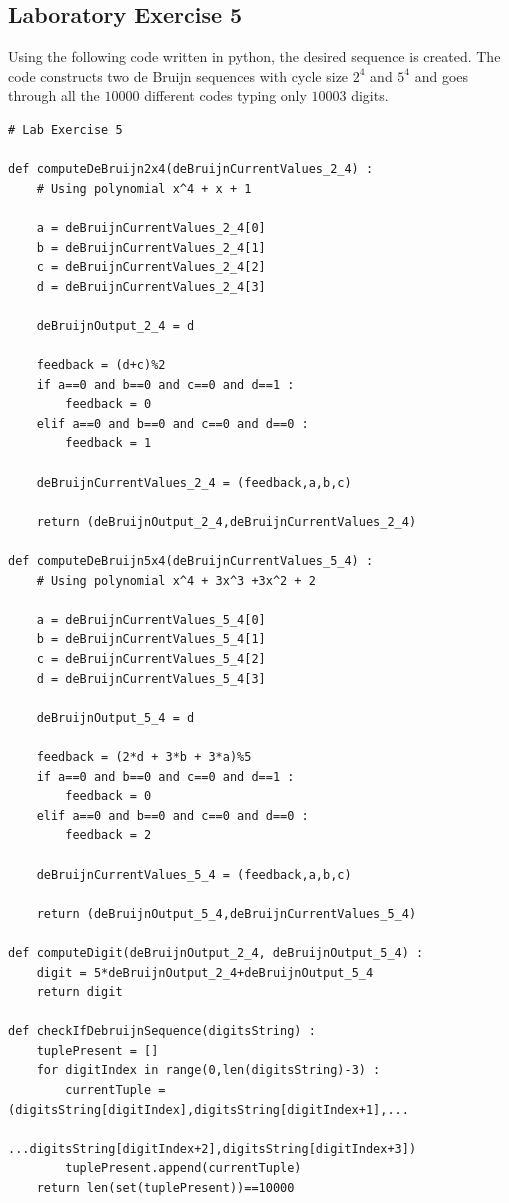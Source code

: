 \documentclass{article}
\begin{document}
\subsection{Laboratory Exercise 5}

Using the following code written in python, the desired sequence is created. The code constructs two de Bruijn sequences with cycle size $2^4$ and $5^4$ and goes through all the $10000$ different codes typing only $10003$ digits.

\begin{verbatim}
# Lab Exercise 5

def computeDeBruijn2x4(deBruijnCurrentValues_2_4) :
    # Using polynomial x^4 + x + 1

    a = deBruijnCurrentValues_2_4[0]
    b = deBruijnCurrentValues_2_4[1]
    c = deBruijnCurrentValues_2_4[2]
    d = deBruijnCurrentValues_2_4[3]

    deBruijnOutput_2_4 = d

    feedback = (d+c)%2
    if a==0 and b==0 and c==0 and d==1 :
        feedback = 0
    elif a==0 and b==0 and c==0 and d==0 :
        feedback = 1

    deBruijnCurrentValues_2_4 = (feedback,a,b,c)

    return (deBruijnOutput_2_4,deBruijnCurrentValues_2_4)

def computeDeBruijn5x4(deBruijnCurrentValues_5_4) :
    # Using polynomial x^4 + 3x^3 +3x^2 + 2

    a = deBruijnCurrentValues_5_4[0]
    b = deBruijnCurrentValues_5_4[1]
    c = deBruijnCurrentValues_5_4[2]
    d = deBruijnCurrentValues_5_4[3]

    deBruijnOutput_5_4 = d

    feedback = (2*d + 3*b + 3*a)%5
    if a==0 and b==0 and c==0 and d==1 :
        feedback = 0
    elif a==0 and b==0 and c==0 and d==0 :
        feedback = 2

    deBruijnCurrentValues_5_4 = (feedback,a,b,c)

    return (deBruijnOutput_5_4,deBruijnCurrentValues_5_4)

def computeDigit(deBruijnOutput_2_4, deBruijnOutput_5_4) :
    digit = 5*deBruijnOutput_2_4+deBruijnOutput_5_4
    return digit

def checkIfDebruijnSequence(digitsString) :
    tuplePresent = []
    for digitIndex in range(0,len(digitsString)-3) :
        currentTuple = (digitsString[digitIndex],digitsString[digitIndex+1],...
                                        ...digitsString[digitIndex+2],digitsString[digitIndex+3])
        tuplePresent.append(currentTuple)
    return len(set(tuplePresent))==10000



\end{verbatim}
\end{document}
